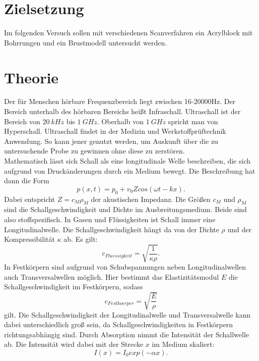 \section{Zielsetzung}
\label{sec:Zielsetzung}
Im folgenden Versuch sollen mit verschiedenen Scanverfahren ein Acrylblock mit Bohrrungen und ein Brustmodell untersucht werden.
\section{Theorie}
\label{sec:Theorie}
Der für Menschen hörbare Frequenzbereich liegt zwischen 16-20000Hz. Der Bereich unterhalb des hörbaren Bereichs heißt Infraschall. Ultraschall ist der Bereich von 
$\SI{20}{kHz}$ bis $\SI{1}{GHz}$. Oberhalb von $\SI{1}{GHz}$ spricht man von Hyperschall. Ultraschall findet in der Medizin und Werkstoffprüftechnik Anwendung. So kann jener
genutzt werden, um Auskunft über die zu untersuchende Probe zu gewinnen ohne diese zu zerstören.\\
Mathematisch lässt sich Schall als eine longitudinale Welle beschreiben, die sich aufgrund von Druckänderungen durch ein Medium bewegt. Die Beschreibung hat dann die Form
\begin{equation*}
    p(x, t) = p_0 + v_0 Z cos(\omega t - kx).
\end{equation*}
Dabei entspricht $Z = c_M \rho_M$ der akustischen Impedanz. Die Größen $c_M$ und $\rho_M$ sind die Schallgeschwindigkeit und Dichte im Ausbreitungsmedium. Beide sind also
stoffspezifisch.
In Gasen und Flüssigkeiten ist Schall immer eine Longitudinalwelle. Die Schallgeschwindigkeit hängt da von der Dichte $\rho$ und der Kompressibilität $\kappa$ ab. Es gilt:
\begin{equation*}
    c_{Fluessigkeit} = \sqrt{\frac{1}{\kappa \rho}}.
\end{equation*}
In Festkörpern sind aufgrund von Schubspannungen neben Longitudinalwellen auch Transversalwellen möglich. Hier bestimmt das Elastizitätsmodul $E$ die Schallgeschwindigkeit
im Festkörpern, sodass
\begin{equation*}
    c_{Festkoerper} = \sqrt{\frac{E}{\rho}}
\end{equation*}
gilt.
Die Schallgeschwindigkeit der Longitudinalwelle und Transversalwelle kann dabei unterschiedlich groß sein, da Schallgeschwindigkeiten in Festkörpern richtungsabhängig sind.
Durch Absorption nimmt die Intensität der Schallwelle ab. Die Intensität wird dabei mit der Strecke $x$ im Medium skaliert:
\begin{equation*}
    I(x) = I_0 exp(-\alpha x).
\end{equation*}
